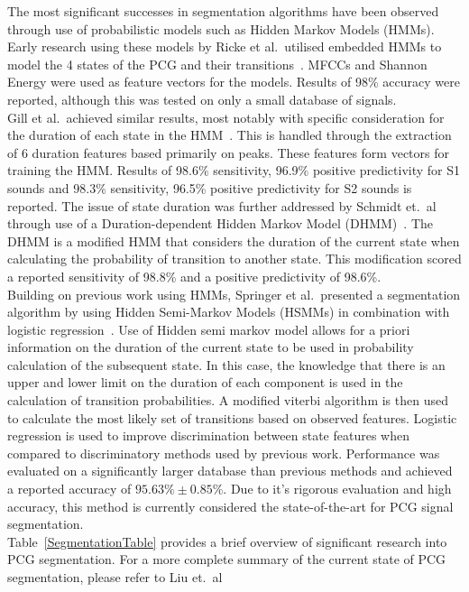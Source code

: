 \documentclass[titlepage, 12pt]{scrartcl} \usepackage{enumitem}
\begin{document}
The most significant successes in segmentation algorithms have been observed through use
of probabilistic models such as Hidden Markov Models (HMMs). Early research
using these models by Ricke et al.\ utilised embedded HMMs to model the 4
states of the PCG and their transitions~\parencite{Ricke2005}. MFCCs and
Shannon Energy were used as feature vectors for the models. Results of
98\% accuracy were reported, although this was tested on only a small database
of signals.\\
Gill et al.\ achieved similar results, most notably with specific consideration
for the duration of each state in the HMM~\parencite{Gill2005}. This is
handled through the extraction of 6 duration features based primarily on peaks.
These features form vectors for training the HMM. Results of 98.6\%
sensitivity, 96.9\% positive predictivity for S1 sounds and 98.3\% sensitivity,
96.5\% positive predictivity for S2 sounds is reported.
The issue of state duration was further addressed by Schmidt et.\ al through use
of a Duration-dependent Hidden Markov Model (DHMM)~\parencite{Schmidt2015}. The
DHMM is a modified HMM that considers the duration of the current state when
calculating the probability of transition to another state. This modification
scored a reported sensitivity of 98.8\% and a positive predictivity of
98.6\%.\\
Building on previous work using HMMs, Springer et al.\ presented a segmentation
algorithm by using Hidden Semi-Markov Models (HSMMs) in combination with
logistic regression~\parencite{Springer2016}. Use of Hidden semi markov model
allows for a priori information on the duration of the current state to be used
in probability calculation of the subsequent state. In this case, the knowledge
that there is an upper and lower limit on the duration of each component is
used in the calculation of transition probabilities.  A modified viterbi algorithm
is then used to calculate the most likely set of transitions based on observed
features. Logistic regression is used to improve discrimination between state
features when compared to discriminatory methods used by previous work.
Performance was evaluated on a significantly larger database than previous
methods and achieved a reported accuracy of $95.63\% \pm 0.85\%$. Due to it's
rigorous evaluation and high accuracy, this method is currently considered the
state-of-the-art for PCG signal segmentation.\\

Table~\ref{SegmentationTable} provides a brief overview of significant research
into PCG segmentation. For a more complete summary of the current state of PCG
segmentation, please refer to Liu et.\ al~\parencite{Liu2016}
\end{document}
